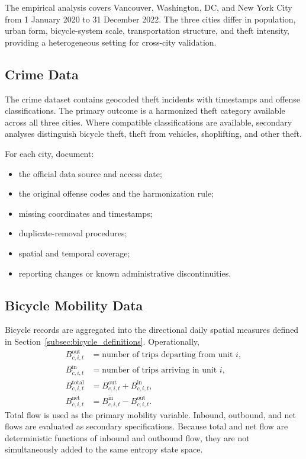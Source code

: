 \documentclass[applsci,article,submit,moreauthors]{Definitions/mdpi}
\begin{document}
The empirical analysis covers Vancouver, Washington, DC, and New York City from 1 January 2020 to 31 December 2022. The three cities differ in population, urban form, bicycle-system scale, transportation structure, and theft intensity, providing a heterogeneous setting for cross-city validation.


\subsection{Crime Data}
\label{subsec:crime_data}

The crime dataset contains geocoded theft incidents with timestamps and offense classifications. The primary outcome is a harmonized theft category available across all three cities. Where compatible classifications are available, secondary analyses distinguish bicycle theft, theft from vehicles, shoplifting, and other theft.

For each city, document:
\begin{itemize}
    \item the official data source and access date;
    \item the original offense codes and the harmonization rule;
    \item missing coordinates and timestamps;
    \item duplicate-removal procedures;
    \item spatial and temporal coverage;
    \item reporting changes or known administrative discontinuities.
\end{itemize}

\subsection{Bicycle Mobility Data}
\label{subsec:bike_data}

Bicycle records are aggregated into the directional daily spatial measures
defined in Section~\ref{subsec:bicycle_definitions}. Operationally,
\begin{align}
B^{\mathrm{out}}_{c,i,t}&=\text{number of trips departing from unit }i,\\
B^{\mathrm{in}}_{c,i,t}&=\text{number of trips arriving in unit }i,\\
B^{\mathrm{total}}_{c,i,t}&=B^{\mathrm{out}}_{c,i,t}+B^{\mathrm{in}}_{c,i,t},\\
B^{\mathrm{net}}_{c,i,t}&=B^{\mathrm{in}}_{c,i,t}-B^{\mathrm{out}}_{c,i,t}.
\end{align}
Total flow is used as the primary mobility variable. Inbound, outbound, and net flows are evaluated as secondary specifications.
Because total and net flow are deterministic functions of inbound and
outbound flow, they are not simultaneously added to the same entropy state
space.
\end{document}
